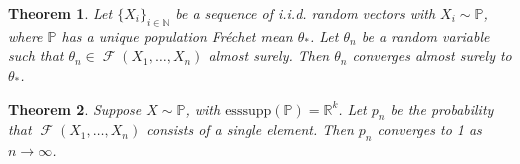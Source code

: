 \documentclass[10pt,a4paper]{amsart}
\newtheorem{theorem}{Theorem}
\DeclareMathOperator{\FMset}{\mathcal{F}}
\newcommand{\N}{\mathbb{N}}
\newcommand{\R}{\mathbb{R}}
\newcommand{\esssupp}{\mathrm{esssupp}}
\newcommand{\mb}[1]{\mathbb #1}
\begin{document}
	\begin{theorem}\label{thm:consistent_FM}
		Let $\{X_i\}_{i \in \N}$ be a sequence of i.i.d. random vectors with $X_i \sim \mb{P}$, where $\mb P$ has a unique population Fr\'echet mean $\theta_*$. Let  $\theta_n$ be a random variable such that $\theta_n \in \FMset(X_1, \dots, X_n)$ almost surely. Then $\theta_n$ converges almost surely to $\theta_*$.
	\end{theorem}

	\begin{theorem}\label{thm:uniqueness_prob_convergence}
		Suppose $X \sim \mb P$, with $\esssupp(\mb P) = \R^k$. Let $p_n$ be the probability that $\FMset(X_1,\dots,X_n)$ consists of a single element. Then $p_n$ converges to 1 as $n \rightarrow \infty$.
	\end{theorem}
\end{document}
